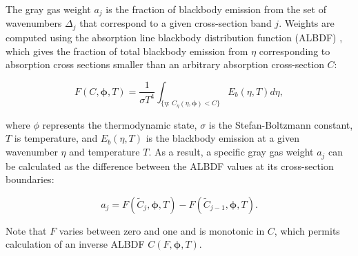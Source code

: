 \documentclass[preprint,12pt]{elsarticle}
\newcommand{\BS}{\boldsymbol}
\newcounter{bla}
\begin{document}
The gray gas weight $a_j$ is the fraction of blackbody emission from the set of wavenumbers $\Delta_j$ that correspond to a given cross-section band $j$. Weights are computed using the absorption line blackbody distribution function (ALBDF) \cite{Pearson_2014}, which gives the fraction of total blackbody emission from $\eta$ corresponding to absorption cross sections smaller than an arbitrary absorption cross-section $C$:
%
\begin{linenomath}
\begin{equation} \label{e:albdf}
F(C,\BS{\phi},T) = \frac{1}{\sigma T^4}\int_{\{\eta:\,C_\eta(\eta,\BS{\phi})<C\}}E_b(\eta,T)d\eta,
\end{equation}
\end{linenomath}
%
where $\phi$ represents the thermodynamic state, $\sigma$ is the Stefan-Boltzmann constant, $T$ is temperature, and $E_b(\eta,T)$ is the blackbody emission at a given wavenumber $\eta$ and temperature $T$.
As a result, a specific gray gas weight $a_j$ can be calculated as the difference between the ALBDF values at its cross-section boundaries:
%
\begin{linenomath}
\begin{equation} \label{e:aj}
a_j = F(\tilde{C}_j,\BS{\phi}, T) - F(\tilde{C}_{j-1}, \BS{\phi},T).
\end{equation}
\end{linenomath}
%
Note that $F$ varies between zero and one and is monotonic in $C$, which permits calculation of an inverse ALBDF $C(F,\BS{\phi},T)$.
\end{document}
